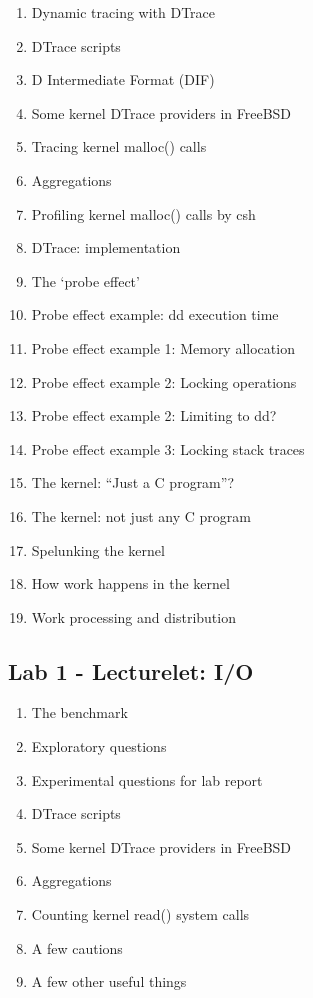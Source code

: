 \documentclass[a4paper,10pt]{article}
\begin{document}
\begin{enumerate}
  \item Dynamic tracing with DTrace
  \item DTrace scripts
  \item D Intermediate Format (DIF)
  \item Some kernel DTrace providers in FreeBSD
  \item Tracing kernel malloc() calls
  \item Aggregations
  \item Profiling kernel malloc() calls by csh
  \item DTrace: implementation
  \item The `probe effect'
  \item Probe effect example: dd execution time
  \item Probe effect example 1: Memory allocation
  \item Probe effect example 2: Locking operations
  \item Probe effect example 2: Limiting to dd?
  \item Probe effect example 3: Locking stack traces
  \item The kernel: ``Just a C program''?
  \item The kernel: not just any C program
  \item Spelunking the kernel
  \item How work happens in the kernel
  \item Work processing and distribution
\end{enumerate}

\subsection*{Lab 1 - Lecturelet: I/O}

\begin{enumerate}
  \item The benchmark
  \item Exploratory questions
  \item Experimental questions for lab report
  \item DTrace scripts
  \item Some kernel DTrace providers in FreeBSD
  \item Aggregations
  \item Counting kernel read() system calls
  \item A few cautions
  \item A few other useful things
\end{enumerate}
\end{document}
